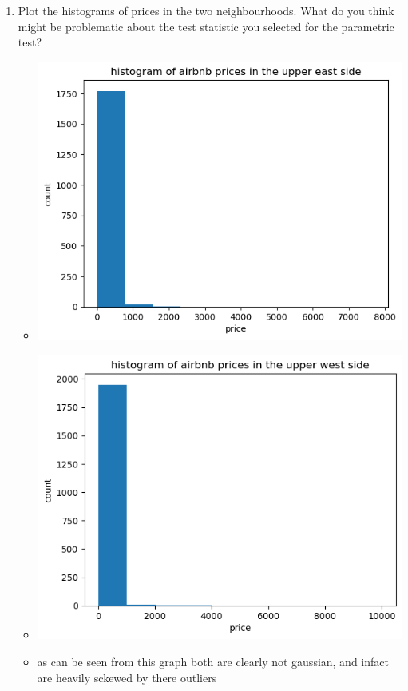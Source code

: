 \documentclass[12pt,twoside]{article}
\begin{document}
\begin{enumerate}
\begin{enumerate}
\item Plot the histograms of prices in the two neighbourhoods. What do you think might be problematic about the test statistic you selected for the parametric test? 
\begin{itemize}
  \color{blue}
  \item \includegraphics{homework/homework_7/immages/4b_1.png} 
   \item \includegraphics{homework/homework_7/immages/4b_2.png}  
  \item as can be seen from this graph both are clearly not gaussian, and infact are heavily sckewed by there outliers
\end{itemize}


\end{enumerate}
\end{enumerate}
\end{document}
